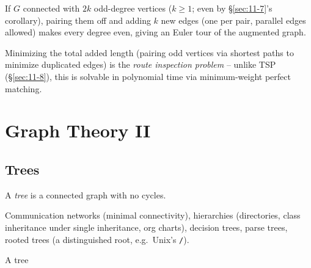 \documentclass[11pt]{article}
\begin{document}
\bigskip
\begin{theorem}
If $G$ connected with $2k$ odd-degree vertices ($k\ge1$; even by \S\ref{sec:11-7}'s corollary), pairing them off and adding $k$ new edges (one per pair, parallel edges allowed) makes every degree even, giving an Euler tour of the augmented graph.
\end{theorem}
\begin{note}
Minimizing the total added length (pairing odd vertices via shortest paths to minimize duplicated edges) is the \emph{route inspection problem} -- unlike TSP (\S\ref{sec:11-8}), this is solvable in polynomial time via minimum-weight perfect matching.
\end{note}

\newpage
\section{Graph Theory II}

\subsection{Trees}
\label{sec:12-1}

\begin{definition}[Tree]
A \emph{tree} is a connected graph with no cycles.
\end{definition}

\begin{note}[Applications]
Communication networks (minimal connectivity), hierarchies (directories, class inheritance under single inheritance, org charts), decision trees, parse trees, rooted trees (a distinguished root, e.g.\ Unix's \texttt{/}).
\end{note}

\begin{center}
\end{center}
\begin{center}
\small A tree
\end{center}
\end{document}
